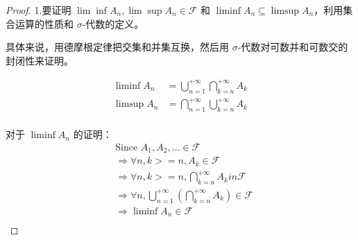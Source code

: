 \documentclass[12pt, a4paper, oneside]{ctexart}
\begin{document}
\begin{proof}








  1.要证明 $\lim \inf A_n, \lim \sup A_n \in \mathcal{F}$ 和 $\liminf A_n \subseteq \limsup A_n$，利用集合运算的性质和 $\sigma$-代数的定义。

  具体来说，用德摩根定律把交集和并集互换，然后用 $\sigma$-代数对可数并和可数交的封闭性来证明。

  $$ \begin{aligned} \liminf A_n & = \bigcup_{n=1}^{+\infty}\bigcap_{k=n}^{+\infty}A_k \\
                \limsup A_n & = \bigcap_{n=1}^{+\infty}\bigcup_{k=n}^{+\infty}A_k \\
    \end{aligned} $$

  对于 $\liminf A_n$ 的证明： $$ \begin{aligned} &\text {Since } A_1,A_2,… \in \mathcal{F}\\ &\Rightarrow \forall n, k >= n, A_k \in \mathcal{F}\\ &\Rightarrow \forall n, k >= n, \bigcap_{k=n}^{+\infty}A_k in \mathcal{F}\\ &\Rightarrow \forall n, \bigcup_{n=1}^{+\infty}(\bigcap_{k=n}^{+\infty}A_k) \in \mathcal{F}\\ &\Rightarrow \liminf A_n \in \mathcal{F}\\ \end{aligned} $$


\end{proof}
\end{document}
